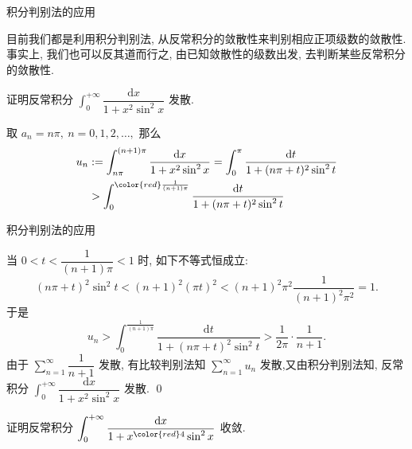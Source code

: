 \begin{frame}{积分判别法的应用}

目前我们都是利用积分判别法, 从反常积分的敛散性来判别相应正项级数的敛散性. 事实上, 我们也可以反其道而行之, 由已知敛散性的级数出发, 去判断某些反常积分的敛散性.

\pause
\vspace{0.6em}

\begin{eg}
\begin{center}
证明反常积分 $\displaystyle \int_0^{+\infty} \dfrac{\mathrm{d} x}{1 + x^2\sin^2 x}$ 发散.
\end{center}
\end{eg}

\pause
\vspace{0.6em}

\startproof[bg=yellow, fg=red]
取 $a_n = n\pi, ~ n = 0, 1, 2, \dots,$ 那么
\begin{align*}
u_n & := \int_{n\pi}^{(n+1)\pi} \dfrac{\mathrm{d} x}{1 + x^2\sin^2 x} = \int_{0}^{\pi} \dfrac{\mathrm{d} t}{1 + (n\pi + t)^2\sin^2 t} \\
& > \int_{0}^{{\color{red} \frac{1}{(n+1)\pi}}} \dfrac{\mathrm{d} t}{1 + (n\pi + t)^2\sin^2 t}
\end{align*}
\end{frame}


\begin{frame}{积分判别法的应用}

当 $0 < t < \dfrac{1}{(n+1)\pi} < 1$ 时, 如下不等式恒成立:
\[(n\pi + t)^2 \sin^2 t < (n + 1)^2 (\pi t)^2 < (n + 1)^2 \pi^2 \dfrac{1}{(n+1)^2\pi^2} = 1.\]
于是
\[u_n > \int_{0}^{\frac{1}{(n+1)\pi}} \dfrac{\mathrm{d} t}{1 + (n\pi + t)^2\sin^2 t} > \dfrac{1}{2\pi} \cdot \dfrac{1}{n+1}.\]
由于 $\sum\limits_{n=1}^\infty \dfrac{1}{n+1}$ 发散, 有比较判别法知 $\sum\limits_{n=1}^\infty u_n$ 发散,又由积分判别法知, 反常积分 $\displaystyle \int_0^{+\infty} \dfrac{\mathrm{d} x}{1 + x^2\sin^2 x}$ 发散.
\qed

\pause

\begin{question}[思考题]
\begin{center}
证明反常积分 $\displaystyle \int_0^{+\infty} \dfrac{\mathrm{d} x}{1 + x^{\color{red}4}\sin^2 x}$ 收敛.
\end{center}
\end{question}

\end{frame}

